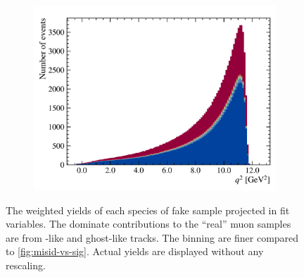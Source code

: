 \begin{figure}[htb]
    \hfill
    \begin{subfigure}[b]{0.32\textwidth}
        \centering
        \includegraphics[width=\textwidth]{figs-fit-fit-templates/data-driven-plots/misid/D0_q2.pdf}
    \end{subfigure}
    \caption[Weighted yields of fake \muon sample.]{
        The weighted yields of each species of fake \muon sample projected in
        fit variables.
        The dominate contributions to the ``real'' muon samples are from
        \pion-like and ghost-like tracks.
        The binning are finer compared to \cref{fig:misid-vs-sig}. Actual
        yields are displayed without any rescaling.
    }
    \label{fig:unfolding-fit-vars}
\end{figure}

